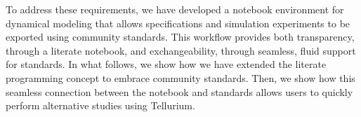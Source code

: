\documentclass[10pt,letterpaper]{article}
\begin{document}
To address these requirements, we have developed a notebook environment for dynamical modeling that allows specifications and simulation experiments to be exported using community standards. This workflow %
provides both transparency, through a literate notebook, and exchangeability, through seamless, fluid support for standards. In what follows, we show how we have extended the literate programming concept to embrace community standards. Then, we show how this seamless connection between the notebook and standards allows users to quickly perform alternative studies using Tellurium.



\end{document}
